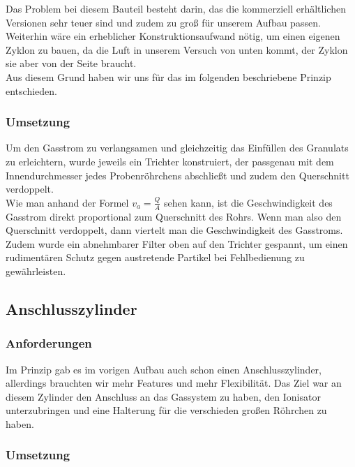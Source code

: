 Das Problem bei diesem Bauteil besteht darin, das die kommerziell erhältlichen Versionen sehr teuer sind und zudem zu groß für unserem Aufbau passen. \\
Weiterhin wäre ein erheblicher Konstruktionsaufwand nötig, um einen eigenen Zyklon zu bauen, da die Luft in unserem Versuch von unten kommt, der Zyklon sie aber von der Seite braucht. \\
Aus diesem Grund haben wir uns für das im folgenden beschriebene Prinzip entschieden.



\subsubsection{Umsetzung}

Um den Gasstrom zu verlangsamen und gleichzeitig das Einfüllen des Granulats zu erleichtern, wurde jeweils ein Trichter konstruiert, der passgenau mit dem Innendurchmesser jedes Probenröhrchens abschließt und zudem den Querschnitt verdoppelt. \\
Wie man anhand der Formel $v_a = \frac{Q}{A}$ \cite{Grollius2012} sehen kann, ist die Geschwindigkeit des Gasstrom direkt proportional zum Querschnitt des Rohrs. Wenn man also den Querschnitt verdoppelt, dann viertelt man die Geschwindigkeit des Gasstroms. \\
Zudem wurde ein abnehmbarer Filter oben auf den Trichter gespannt, um einen rudimentären Schutz gegen austretende Partikel bei Fehlbedienung zu gewährleisten.


\subsection{Anschlusszylinder}

\subsubsection{Anforderungen}

Im Prinzip gab es im vorigen Aufbau auch schon einen Anschlusszylinder, allerdings brauchten wir mehr Features und mehr Flexibilität. Das Ziel war an diesem Zylinder den Anschluss an das Gassystem zu haben, den Ionisator unterzubringen und eine Halterung für die verschieden großen Röhrchen zu haben.


\subsubsection{Umsetzung}

